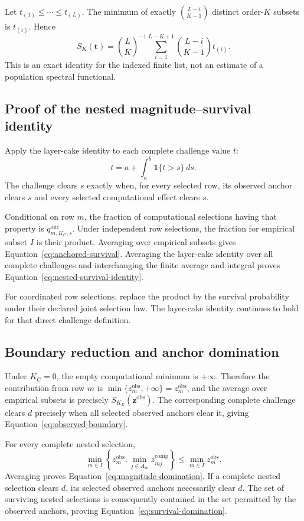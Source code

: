 \documentclass[11pt]{article}
\theoremstyle{remark}
\begin{document}
Let $t_{(1)}\leq\cdots\leq t_{(L)}$. The minimum of exactly
$\binom{L-i}{K-1}$ distinct order-$K$ subsets is $t_{(i)}$. Hence
\begin{equation}
S_K(\mathbf t)
=
\binom{L}{K}^{-1}
\sum_{i=1}^{L-K+1}
\binom{L-i}{K-1}t_{(i)}.
\label{eq:finite-ordered}
\end{equation}
This is an exact identity for the indexed finite list, not an estimate of a
population spectral functional.

\subsection{Proof of the nested magnitude--survival identity}

Apply the layer-cake identity to each complete challenge value $t$:
\[
t
=
a+\int_a^b\mathbf 1\{t>s\}\,ds.
\]
The challenge clears $s$ exactly when, for every selected row, its observed
anchor clears $s$ and every selected computational effect clears $s$.

Conditional on row $m$, the fraction of computational selections having that
property is $q^{\mathrm{anc}}_{m,K_C,s}$. Under independent row selections, the
fraction for empirical subset $I$ is their product. Averaging over empirical
subsets gives Equation~\eqref{eq:anchored-survival}. Averaging the layer-cake
identity over all complete challenges and interchanging the finite average and
integral proves Equation~\eqref{eq:nested-survival-identity}.

For coordinated row selections, replace the product by the survival
probability under their declared joint selection law. The layer-cake identity
continues to hold for that direct challenge definition.

\subsection{Boundary reduction and anchor domination}

Under $K_C=0$, the empty computational minimum is $+\infty$. Therefore
the contribution from row $m$ is
$\min\{z_m^{\mathrm{obs}},+\infty\}=z_m^{\mathrm{obs}}$, and the average over
empirical subsets is precisely $S_{K_E}(\mathbf z^{\mathrm{obs}})$. The
corresponding complete challenge clears $d$ precisely when all selected
observed anchors clear it, giving Equation~\eqref{eq:observed-boundary}.

For every complete nested selection,
\[
\min_{m\in I}
\left\{z_m^{\mathrm{obs}},
\min_{j\in A_m}z_{mj}^{\mathrm{comp}}\right\}
\leq
\min_{m\in I}z_m^{\mathrm{obs}}.
\]
Averaging proves Equation~\eqref{eq:magnitude-domination}. If a complete
nested selection clears $d$, its selected observed anchors necessarily clear
$d$. The set of surviving nested selections is consequently contained in the
set permitted by the observed anchors, proving
Equation~\eqref{eq:survival-domination}.
\end{document}
